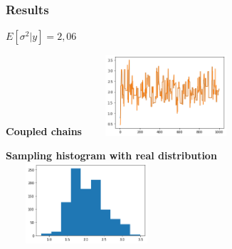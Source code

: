 \documentclass{beamer}
\begin{document}
\begin{frame}
	\frametitle{Results}
	$ E[\sigma^2|y]=2,06 $
	\begin{center}
		\begin{minipage}{0.63\textwidth}
			\begin{center}
				{\scriptsize \textbf{Coupled chains}}
				\includegraphics[width=6cm,height=3cm]{immagini_mario/sigma_chains}
			\end{center}
		\end{minipage}
		
		\vspace{0.2cm}
		
		\begin{minipage}{0.63\textwidth}
			\begin{center}
				{\scriptsize \textbf{Sampling histogram with real distribution}}
				\includegraphics[width=6cm,height=3cm]{immagini_mario/sigma_hist}
			\end{center}
		\end{minipage}
	\end{center}
\end{frame}
\end{document}
